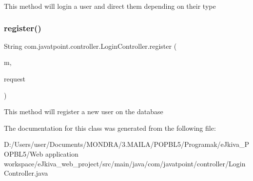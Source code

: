 This method will login a user and direct them depending on their type \mbox{\label{classcom_1_1javatpoint_1_1controller_1_1_login_controller_adb27cb866c614d9060fd6cd3db3c4a3a}} 
\subsubsection{\texorpdfstring{register()}{register()}}
{\footnotesize\ttfamily String com.\+javatpoint.\+controller.\+Login\+Controller.\+register (\begin{DoxyParamCaption}\item[{Model}]{m,  }\item[{Web\+Request}]{request }\end{DoxyParamCaption})\hspace{0.3cm}{\ttfamily [inline]}}

This method will register a new user on the database 

The documentation for this class was generated from the following file\+:\begin{DoxyCompactItemize}
\item 
D\+:/\+Users/user/\+Documents/\+M\+O\+N\+D\+R\+A/3.\+M\+A\+I\+L\+A/\+P\+O\+P\+B\+L5/\+Programak/e\+Jkiva\+\_\+\+P\+O\+P\+B\+L5/\+Web application workspace/e\+Jkiva\+\_\+web\+\_\+project/src/main/java/com/javatpoint/controller/Login\+Controller.\+java\end{DoxyCompactItemize}
